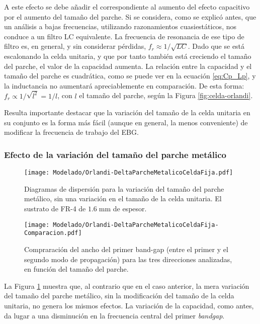 A este efecto se debe añadir el correspondiente al aumento del efecto capacitivo por el aumento del tamaño del parche. Si se considera, como se explicó antes, que un análisis a bajas frecuencias, utilizando razonamientos cuasiestáticos, nos conduce a un filtro LC equivalente. La frecuencia de resonancia de ese tipo de filtro es, en general, y sin considerar pérdidas, $f_r \approx 1/\sqrt{LC}$. Dado que se está escalonando la celda unitaria, y que por tanto también está creciendo el tamaño del parche, el valor de la capacidad aumenta. La relación entre la capacidad y el tamaño del parche es cuadrática, como se puede ver en la ecuación \ref{eq:Cp_Lp}, y la inductancia no aumentará apreciablemente en comparación. De esta forma: $f_r \propto 1/\sqrt{l^2} = 1/l$, con $l$ el tamaño del parche, según la Figura \ref{fig:celda-orlandi}.

Resulta importante destacar que la variación del tamaño de la celda unitaria en su conjunto es la forma más fácil (aunque en general, la menos conveniente) de modificar la frecuencia de trabajo del EBG.

\clearpage

\subsubsection{Efecto de la variación del tamaño del parche metálico}

\begin{figure}[h]
	\centering
	\texttt{[image: Modelado/Orlandi-DeltaParcheMetalicoCeldaFija.pdf]}
	\caption{Diagramas de dispersión para la variación del tamaño del parche metálico, sin una variación en el tamaño de la celda unitaria. El sustrato de FR-4 de $1.6\;\text{mm}$ de espesor.}
	\label{fig:diagdisp-orlandi-variacion-tam-parche}
\end{figure}


\begin{figure}[h]
	\centering
	\texttt{[image: Modelado/Orlandi-DeltaParcheMetalicoCeldaFija-Comparacion.pdf]}
	\caption{Compraración del ancho del primer band-gap (entre el primer y el segundo modo de propagación) para las tres direcciones analizadas, en función del tamaño del parche.}
	\label{fig:comparacion-diagdisp-orlandi-variacion-tam-parche}
\end{figure}

La Figura \ref{fig:diagdisp-orlandi-variacion-tam-parche} muestra que, al contrario que en el caso anterior, la mera variación del tamaño del parche metálico, sin la modificación del tamaño de la celda unitaria, no genera los mismos efectos. La variación de la capacidad, como antes, da lugar a una disminución en la frecuencia central del primer \textit{bandgap}.

